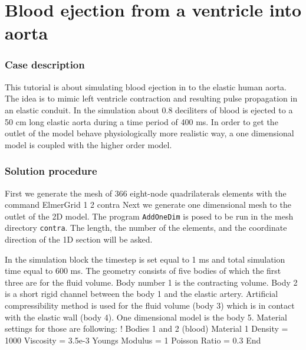 \chapter{Blood ejection from a ventricle into aorta}


\subsection*{Case description}

This tutorial is about simulating blood ejection in to the elastic human aorta.
The idea is to mimic left ventricle contraction and resulting pulse propagation 
in an elastic conduit. In the simulation about 0.8 
deciliters of blood is ejected to a 50 cm long elastic aorta during a time 
period of 400 ms.  In order to get the outlet of the model behave 
physiologically more realistic way, a one dimensional model is coupled
with the higher order model.
 
\subsection*{Solution procedure}

First we generate the mesh of 366 eight-node quadrilaterals elements with 
the command
\ttbegin
ElmerGrid 1 2 contra
\ttend
Next we generate one dimensional mesh to the outlet of the 2D model.
The program {\tt AddOneDim} is posed to be run in the mesh directory
{\tt contra}.  The length, the number of the elements, 
and the coordinate direction of the 1D section will be asked.

In the simulation block the timestep is set equal to 1 ms and 
total simulation time equal to 600 ms.  The geometry consists of five bodies
of which the first three are for the fluid volume.  Body number 1 is the
contracting volume.  Body 2 is a short rigid channel between the body 1 and 
the elastic artery. Artificial compressibility
method is used for the fluid volume (body 3) which is in contact with the 
elastic wall (body 4).  One dimensional model is the body 5. 
Material settings for those are 
following:
\ttbegin
! Bodies 1 and 2 (blood)
Material 1
  Density = 1000
  Viscosity = 3.5e-3
  Youngs Modulus = 1
  Poisson Ratio = 0.3
End

